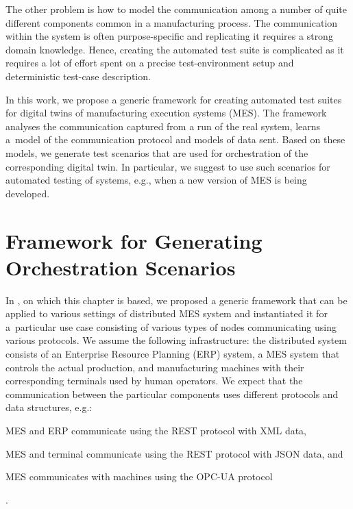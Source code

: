 {The other problem is how to model the communication among a number of quite
different components common in a manufacturing process.
%
The communication within the system is often purpose-specific and replicating it requires
a strong domain knowledge. 
%
Hence, creating the automated test suite is complicated as it requires a lot of effort
spent on a precise test-environment setup and deterministic test-case
description.

In this work, we propose a generic framework for creating automated test suites
for digital twins of manufacturing execution systems (MES).  
%
The framework analyses the communication captured from a run of the real
system, learns a~model of the communication protocol and models of data sent.
%
Based on these models, we generate test scenarios that are used for
orchestration of the corresponding digital twin.
%
In particular, we suggest to use such scenarios for automated testing of
systems, e.g., when a new version of MES is being developed.

\section{Framework for Generating Orchestration Scenarios}
\label{sec:overview}

In \cite{eurocast22}, on which this chapter is based,
we proposed a generic framework that can be applied to various settings of
distributed MES system and instantiated it for
a~particular use case consisting of various types of nodes communicating using
various protocols.
%
We assume the following infrastructure: the distributed system consists of an
Enterprise Resource Planning (ERP) system, a MES system that controls the
actual production, and manufacturing machines with their corresponding terminals
used by human operators.  
%
We expect that the communication between the particular components uses
different protocols and data structures, e.g.: \begin{inparaenum}[(1)]
%
\item MES and ERP communicate using the REST protocol with XML data, 
%
\item MES and terminal communicate using the REST protocol with JSON data, and 
%
\item MES communicates with machines using the OPC-UA protocol\end{inparaenum}.

}
